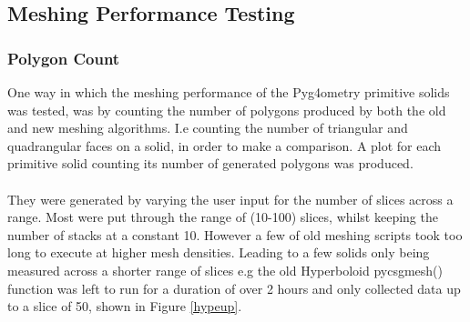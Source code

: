 \documentclass[12pt,a4paper]{article}
\begin{document}
\newpage
\subsection{Meshing Performance Testing}
\subsubsection{Polygon Count}
One way in which the meshing performance of the Pyg4ometry primitive solids was tested, was by counting the number of polygons produced by both the old and new meshing algorithms. I.e counting the number of triangular and quadrangular faces on a solid, in order to make a comparison. A plot for each primitive solid counting its number of generated polygons was produced.
\\\\
They were generated by varying the user input for the number of slices across a range. Most were put through the range of (10-100) slices, whilst keeping the number of stacks at a constant 10. However a few of old meshing scripts took too long to execute at higher mesh densities. Leading to a few solids only being measured across a shorter range of slices e.g the old Hyperboloid pycsgmesh() function was left to run for a duration of over 2 hours and only collected data up to a slice of 50, shown in Figure \ref{hypeup}.  \\
\end{document}
